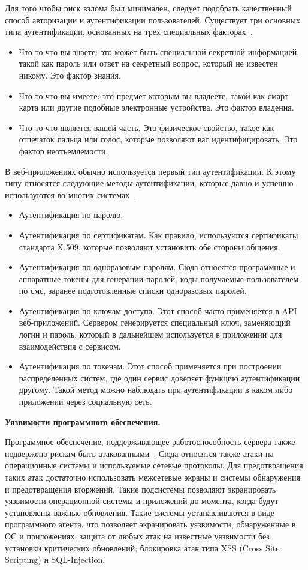 Для того чтобы риск взлома был минимален, следует подобрать качественный способ авторизации и аутентификации пользователей. Существует три основных типа аутентификации, основанных на трех специальных факторах~\cite{pandya2015overview}.

\begin{itemize}
	\item Что-то что вы знаете: это может быть специальной секретной информацией, такой как пароль или ответ на секретный вопрос, который не известен никому. Это фактор знания.
	\item Что-то что вы имеете: это предмет которым вы владеете, такой как смарт карта или другие подобные электронные устройства. Это фактор владения.
	\item Что-то что является вашей часть. Это физическое свойство, такое как отпечаток пальца или голос, которые позволяют вас идентифицировать. Это фактор неотъемлемости.
\end{itemize}

В веб-приложениях обычно используется первый тип аутентификации. К этому типу относятся следующие методы аутентификации, которые давно и успешно используются во многих системах~\cite{DataArt}.

\begin{itemize}
	\item Аутентификация по паролю.
	\item Аутентификация по сертификатам. Как правило, используются сертификаты стандарта X.509, которые позволяют установить обе стороны общения.
	\item Аутентификация по одноразовым паролям. Сюда относятся программные и аппаратные токены для генерации паролей, коды получаемые пользователем по смс, заранее подготовленные списки одноразовых паролей.
	\item Аутентификация по ключам доступа. Этот способ часто применяется в API веб-приложений. Сервером генерируется специальный ключ, заменяющий логин и пароль, который в дальнейшем используется в приложении для взаимодействия с сервисом.
	\item Аутентификация по токенам. Этот способ применяется при построении распределенных систем, где один сервис доверяет функцию аутентификации другому. Такой метод можно наблюдать при аутентификации в каком либо приложении через социальную сеть.
\end{itemize}

\textbf{Уязвимости программного обеспечения.}

Программное обеспечение, поддерживающее работоспособность сервера также подвержено рискам быть атакованными~\cite{volkov2015analize}. Сюда относятся также атаки на операционные системы и используемые сетевые протоколы. Для предотвращения таких атак достаточно использовать межсетевые экраны и системы обнаружения и предотвращения вторжений. Такие подсистемы позволяют экранировать уязвимости операционной системы и приложений до момента, когда будут установлены важные обновления. Такие системы устанавливаются в виде программного агента, что позволяет экранировать уязвимости, обнаруженные в ОС и приложениях: защита от любых атак на известные уязвимости без установки критических обновлений; блокировка атак типа XSS (Cross Site Scripting) и SQL-Injection.

